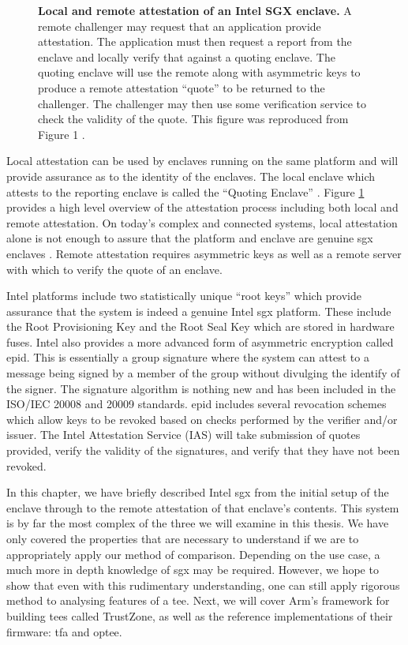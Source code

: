 \begin{figure}[ht]
\centering

\caption[Intel SGX Attestation]{\textbf{Local and remote attestation of an Intel SGX enclave.} A remote challenger may request that an application provide attestation. The application must then request a report from the enclave and locally verify that against a quoting enclave. The quoting enclave will use the remote along with asymmetric keys to produce a remote attestation ``quote'' to be returned to the challenger. The challenger may then use some verification service to check the validity of the quote. This figure was reproduced from Figure 1 \cite{johnson2016intel}.}
\label{fig:sgx-attest}
\end{figure}

Local attestation can be used by enclaves running on the same platform and will provide assurance as to the identity of the enclaves. The local enclave which attests to the reporting enclave is called the ``Quoting Enclave'' \cite{johnson2016intel}. Figure \ref{fig:sgx-attest} provides a high level overview of the attestation process including both local and remote attestation. On today's complex and connected systems, local attestation alone is not enough to assure that the platform and enclave are genuine \gls{sgx} enclaves \cite{knauth2018integrating}. Remote attestation requires asymmetric keys as well as a remote server with which to verify the quote of an enclave.

Intel platforms include two statistically unique ``root keys'' which provide assurance that the system is indeed a genuine Intel \gls{sgx} platform. These include the Root Provisioning Key and the Root Seal Key \cite{johnson2016intel} which are stored in hardware fuses. Intel also provides a more advanced form of asymmetric encryption called \gls{epid}. This is essentially a group signature where the system can attest to a message being signed by a member of the group without divulging the identify of the signer. The signature algorithm is nothing new \cite{brickell2007enhanced} and has been included in the ISO/IEC 20008 and 20009 standards. \gls{epid} includes several revocation schemes which allow keys to be revoked based on checks performed by the verifier and/or issuer. The Intel Attestation Service (IAS) will take submission of quotes provided, verify the validity of the signatures, and verify that they have not been revoked.

In this chapter, we have briefly described Intel \gls{sgx} from the initial setup of the enclave through to the remote attestation of that enclave's contents. This system is by far the most complex of the three we will examine in this thesis. We have only covered the properties that are necessary to understand if we are to appropriately apply our method of comparison. Depending on the use case, a much more in depth knowledge of \gls{sgx} may be required. However, we hope to show that even with this rudimentary understanding, one can still apply rigorous method to analysing features of a \gls{tee}. Next, we will cover Arm's framework for building \glspl{tee} called TrustZone, as well as the reference implementations of their firmware: \gls{tfa} and \gls{optee}.